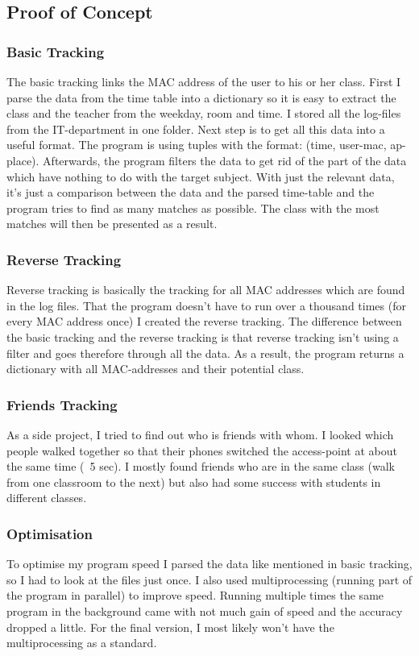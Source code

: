 \documentclass{article}
\begin{document}
\subsection{Proof of Concept}
\subsubsection{Basic Tracking}
The basic tracking links the MAC address of the user to his or her class. First I parse the data from the time table into a dictionary so it is easy to extract the class and the teacher from the weekday, room and time. I stored all the log-files from the IT-department in one folder. Next step is to get all this data into a useful format. The program is using tuples with the format: (time, user-mac, ap-place). Afterwards, the program filters the data to get rid of the part of the data which have nothing to do with the target subject. With just the relevant data, it's just a comparison between the data and the parsed time-table and the program tries to find as many matches as possible. The class with the most matches will then be presented as a result.
\subsubsection{Reverse Tracking}
Reverse tracking is basically the tracking for all MAC addresses which are found in the log files. That the program doesn't have to run over a thousand times (for every MAC address once) I created the reverse tracking. The difference between the basic tracking and the reverse tracking is that reverse tracking isn't using a filter and goes therefore through all the data. As a result, the program returns a dictionary with all MAC-addresses and their potential class.
\subsubsection{Friends Tracking}
As a side project, I tried to find out who is friends with whom. I looked which people walked together so that their phones switched the access-point at about the same time (~5 sec). I mostly found friends who are in the same class (walk from one classroom to the next) but also had some success with students in different classes.
\subsubsection{Optimisation}
To optimise my program speed I parsed the data like mentioned in basic tracking, so I had to look at the files just once. I also used multiprocessing (running part of the program in parallel) to improve speed. Running multiple times the same program in the background came with not much gain of speed and the accuracy dropped a little. For the final version, I most likely won't have the multiprocessing as a standard. 
\end{document}
